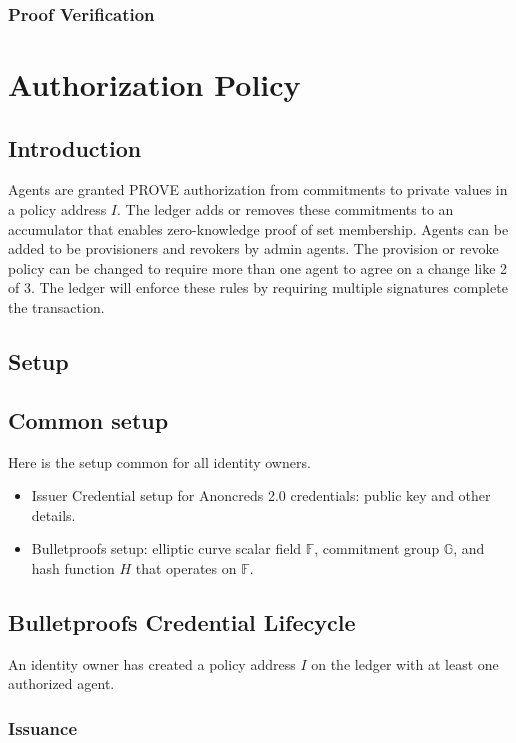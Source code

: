 \documentclass[a4paper]{article}
\begin{document}
\subsubsection{Proof Verification}

\section{Authorization Policy}
\subsection{Introduction}

Agents are granted PROVE authorization from commitments to private values in a policy address $I$. The ledger adds or removes these commitments to an accumulator that enables zero-knowledge proof of set membership. Agents can be added to be provisioners and revokers by admin agents. The provision or revoke policy can be changed to require more than one agent to agree on a change like 2 of 3. The ledger will enforce these rules by requiring multiple signatures complete the transaction.

\subsection{Setup}

\subsection{Common setup}
Here is the setup common for all identity owners.
\begin{itemize}
\item Issuer Credential setup for Anoncreds 2.0 credentials: public key  and other details.
\item Bulletproofs setup: elliptic curve scalar field $\mathbb{F}$, commitment group $\mathbb{G}$, and hash function $H$ that operates on $\mathbb{F}$.
\end{itemize}

\subsection{Bulletproofs Credential Lifecycle}

An identity owner has created a policy address $I$ on the ledger with at least one authorized agent.

\subsubsection{Issuance}
\end{document}
